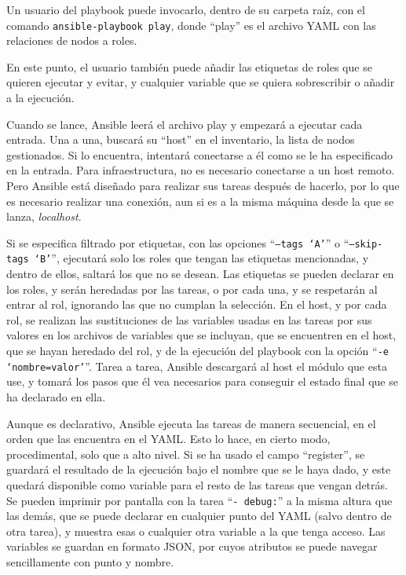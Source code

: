 \documentclass[11pt]{article}
\begin{document}
\begin{flushleft}
    Un usuario del playbook puede invocarlo, dentro de su carpeta raíz, con el comando \texttt{ansible-playbook play}, donde ``play'' es el archivo YAML con las relaciones de nodos a roles. 
    \linebreak
    
    En este punto, el usuario también puede añadir las etiquetas de roles que se quieren ejecutar y evitar, y cualquier variable que se quiera sobrescribir o añadir a la ejecución. 
    \linebreak

    Cuando se lance, Ansible leerá el archivo play y empezará a ejecutar cada entrada. Una a una, buscará su ``host'' en el inventario, la lista de nodos gestionados. Si lo encuentra, intentará conectarse a él como se le ha especificado en la entrada. Para infraestructura, no es necesario conectarse a un host remoto. Pero Ansible está diseñado para realizar sus tareas después de hacerlo, por lo que es necesario realizar una conexión, aun si es a la misma máquina desde la que se lanza, \textit{\gls{localhost}}.
    \linebreak
    
    Si se especifica filtrado por etiquetas, con las opciones ``\texttt{--tags `A'}'' o ``\texttt{--skip-tags `B'}'', ejecutará solo los roles que tengan las etiquetas mencionadas, y dentro de ellos, saltará los que no se desean. Las etiquetas se pueden declarar en los roles, y serán heredadas por las tareas, o por cada una, y se respetarán al entrar al rol, ignorando las que no cumplan la selección. En el host, y por cada rol, se realizan las sustituciones de las variables usadas en las tareas por sus valores en los archivos de variables que se incluyan, que se encuentren en el host, que se hayan heredado del rol, y de la ejecución del playbook con la opción ``\texttt{-e `nombre=valor'}''. Tarea a tarea, Ansible descargará al host el módulo que esta use, y tomará los pasos que él vea necesarios para conseguir el estado final que se ha declarado en ella.
    \linebreak

    Aunque es declarativo, Ansible ejecuta las tareas de manera secuencial, en el orden que las encuentra en el YAML. Esto lo hace, en cierto modo, procedimental, solo que a alto nivel. Si se ha usado el campo ``register'', se guardará el resultado de la ejecución bajo el nombre que se le haya dado, y este quedará disponible como variable para el resto de las tareas que vengan detrás. Se pueden imprimir por pantalla con la tarea ``\texttt{- debug:}'' a la misma altura que las demás, que se puede declarar en cualquier punto del YAML (salvo dentro de otra tarea), y muestra esas o cualquier otra variable a la que tenga acceso. Las variables se guardan en formato JSON, por cuyos atributos se puede navegar sencillamente con punto y nombre.
    \linebreak


\end{flushleft}
\end{document}
